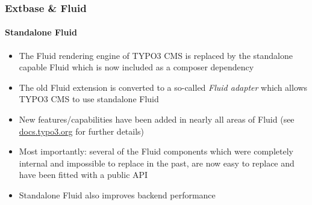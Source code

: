 \begin{frame}[fragile]
	\frametitle{Extbase \& Fluid}
	\framesubtitle{Standalone Fluid}

	\lstset{basicstyle=\tiny\ttfamily}

	\begin{itemize}

		\item The Fluid rendering engine of TYPO3 CMS is replaced by the standalone
			capable Fluid which is now included as a composer dependency

		\item The old Fluid extension is converted to a so-called \textit{Fluid adapter}
			which allows TYPO3 CMS to use standalone Fluid

		\item New features/capabilities have been added in nearly all areas of Fluid\newline
			\small
				(see \href{https://docs.typo3.org/typo3cms/extensions/core/8-dev/Changelog/8.0/Feature-69863-UseNewStandaloneFluidAsComposerDependency.html}{docs.typo3.org}
				for further details)
			\normalsize

		\item Most importantly: several of the Fluid components which were completely
			internal and impossible to replace in the past, are now easy to
			replace and have been fitted with a public API

		\item Standalone Fluid also improves backend performance

	\end{itemize}

\end{frame}


